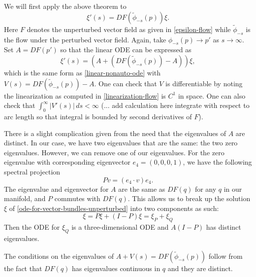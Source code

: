 We will first apply the above theorem to 
\begin{equation}
	\xi'(s) = DF(\tilde \phi_{-s}(p)) \xi.
\end{equation}
Here \(F\) denotes the unperturbed vector field as given in \cref{epsilon-flow} while \(\tilde\phi_{-s}\) is the flow under the perturbed vector field. Again, take \(\phi_{-s}(p) \to p '\) as \(s\to \infty\). Set \(A = DF(p')\) so that the linear ODE can be expressed as
\begin{equation}\label{ode-for-vector-bundles-unperturbed}
	\xi'(s) = (A + (DF(\tilde \phi_{-s}(p)) - A)) \xi,
\end{equation}
which is the same form as \cref{linear-nonauto-ode} with \(V(s) = DF(\tilde \phi_{-s}(p)) - A\). One can check that \(V\) is differentiable by noting the linearization as computed in \cref{linearization-flow} is \(C^1\) in space. One can also check that \(\int_{0}^\infty |V'(s)|\, ds < \infty\) (... add calculation here integrate with respect to arc length so that integral is bounded by second derivatives of \(F\)).

There is a slight complication given from the need that the eigenvalues of \(A\) are distinct. In our case, we have two eigenvalues that are the same: the two zero eigenvalues. However, we can remove one of our eigenvalues. For the zero eigenvalue with corresponding eigenvector \(e_4 = (0, 0, 0, 1)\), we have the following spectral projection
\begin{equation}
	P v = (e_4 \cdot v) e_4.
\end{equation}
The eigenvalue and eigenvector for \(A\) are the same as \(DF(q)\) for any \(q\) in our manifold, and \(P\) commutes with \(DF(q)\). This allows us to break up the solution \(\xi\) of \cref{ode-for-vector-bundles-unperturbed} into two components as such:
\begin{equation}
	\xi = P\xi + (I-P)\xi = \xi_P + \xi_Q
\end{equation}
Then the ODE for \(\xi_Q\) is a three-dimensional ODE and \(A(I-P)\) has distinct eigenvalues.

The conditions on the eigenvalues of \(A+V(s) = DF(\tilde\phi_{-s}(p))\) follow from the fact that \(DF(q)\) has eigenvalues continuous in \(q\) and they are distinct.